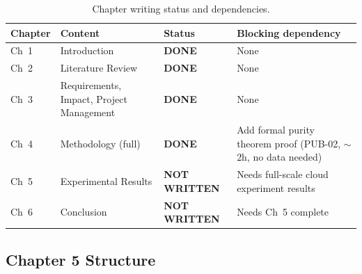 \documentclass[12pt,a4paper]{article}
\begin{document}
\begin{table}[htbp]
\centering
\caption{Chapter writing status and dependencies.}
\label{tab:writing}
\renewcommand{\arraystretch}{1.3}
\begin{tabular}{@{}p{1.8cm}p{3.5cm}p{2.5cm}p{4.5cm}@{}}
\toprule
\textbf{Chapter} & \textbf{Content} & \textbf{Status} & \textbf{Blocking dependency} \\
\midrule
Ch~1 & Introduction & \textcolor{okgreen}{\textbf{DONE}} & None \\
Ch~2 & Literature Review & \textcolor{okgreen}{\textbf{DONE}} & None \\
Ch~3 & Requirements, Impact, Project Management &
  \textcolor{okgreen}{\textbf{DONE}} & None \\
Ch~4 & Methodology (full) & \textcolor{okgreen}{\textbf{DONE}} &
  Add formal purity theorem proof (PUB-02, $\sim$2h, no data needed) \\
Ch~5 & Experimental Results & \textcolor{fixred}{\textbf{NOT WRITTEN}} &
  Needs full-scale cloud experiment results \\
Ch~6 & Conclusion & \textcolor{fixred}{\textbf{NOT WRITTEN}} &
  Needs Ch~5 complete \\
\bottomrule
\end{tabular}
\end{table}

\subsection{Chapter 5 Structure}
\end{document}
